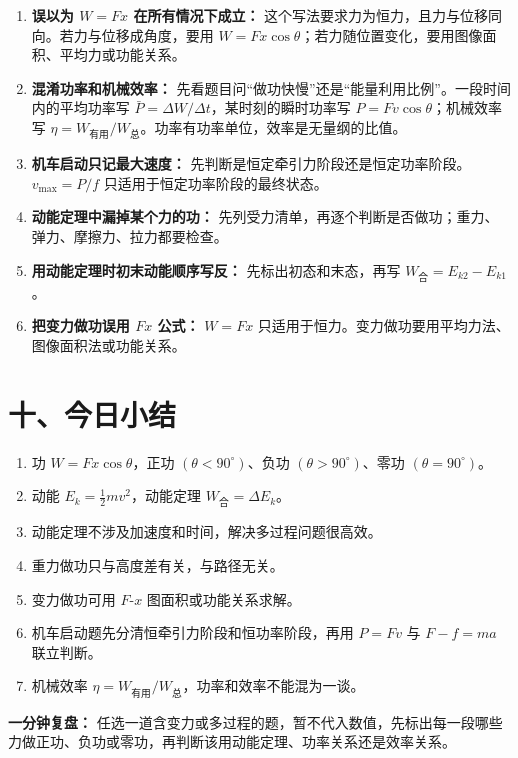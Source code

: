 \begin{mistakebox}
\begin{enumerate}[nosep]
  \item \textbf{误以为 $W = Fx$ 在所有情况下成立：} 这个写法要求力为恒力，且力与位移同向。若力与位移成角度，要用 $W=Fx\cos\theta$；若力随位置变化，要用图像面积、平均力或功能关系。

  \item \textbf{混淆功率和机械效率：} 先看题目问“做功快慢”还是“能量利用比例”。一段时间内的平均功率写
  $\bar P=\Delta W/\Delta t$，某时刻的瞬时功率写
  $P=Fv\cos\theta$；机械效率写
  $\eta=W_{\text{有用}}/W_{\text{总}}$。功率有功率单位，效率是无量纲的比值。
  \item \textbf{机车启动只记最大速度：} 先判断是恒定牵引力阶段还是恒定功率阶段。$v_{\max}=P/f$ 只适用于恒定功率阶段的最终状态。

  \item \textbf{动能定理中漏掉某个力的功：} 先列受力清单，再逐个判断是否做功；重力、弹力、摩擦力、拉力都要检查。

  \item \textbf{用动能定理时初末动能顺序写反：} 先标出初态和末态，再写 $W_{\text{合}}=E_{k2}-E_{k1}$。

  \item \textbf{把变力做功误用 $Fx$ 公式：} $W = Fx$ 只适用于恒力。变力做功要用平均力法、图像面积法或功能关系。
\end{enumerate}
\end{mistakebox}

\section*{十、今日小结}

\begin{enumerate}[nosep]
  \item 功 $W = Fx\cos\theta$，正功 $(\theta < 90^\circ)$、负功 $(\theta > 90^\circ)$、零功 $(\theta = 90^\circ)$。
  \item 动能 $E_k = \frac12 mv^2$，动能定理 $W_{\text{合}} = \Delta E_k$。
  \item 动能定理不涉及加速度和时间，解决多过程问题很高效。
  \item 重力做功只与高度差有关，与路径无关。
  \item 变力做功可用 $F$-$x$ 图面积或功能关系求解。
  \item 机车启动题先分清恒牵引力阶段和恒功率阶段，再用 $P=Fv$ 与 $F-f=ma$ 联立判断。
  \item 机械效率 $\eta=W_{\text{有用}}/W_{\text{总}}$，功率和效率不能混为一谈。
\end{enumerate}

\textbf{一分钟复盘：} 任选一道含变力或多过程的题，暂不代入数值，先标出每一段哪些力做正功、负功或零功，再判断该用动能定理、功率关系还是效率关系。

